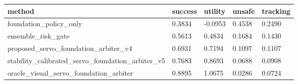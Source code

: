 \begin{tabular}{lllll}
\toprule
method & success & utility & unsafe & tracking \\
\midrule
foundation\_policy\_only & 0.3834 & -0.0953 & 0.4538 & 0.2490 \\
ensemble\_risk\_gate & 0.5613 & 0.4834 & 0.1684 & 0.1430 \\
proposed\_servo\_foundation\_arbiter\_v4 & 0.6931 & 0.7194 & 0.1097 & 0.1107 \\
stability\_calibrated\_servo\_foundation\_arbiter\_v5 & 0.7683 & 0.8693 & 0.0688 & 0.0908 \\
oracle\_visual\_servo\_foundation\_arbiter & 0.8895 & 1.0675 & 0.0286 & 0.0724 \\
\bottomrule
\end{tabular}
